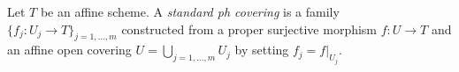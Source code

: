 \begin{definition}
\label{definition-standard-ph-covering}
Let $T$ be an affine scheme. A {\it standard ph covering} is a family
$\{f_j : U_j \to T\}_{j = 1, \ldots, m}$ constructed from a
proper surjective morphism $f : U \to T$ and an affine open covering
$U = \bigcup_{j = 1, \ldots, m} U_j$ by setting $f_j = f|_{U_j}$.
\end{definition}